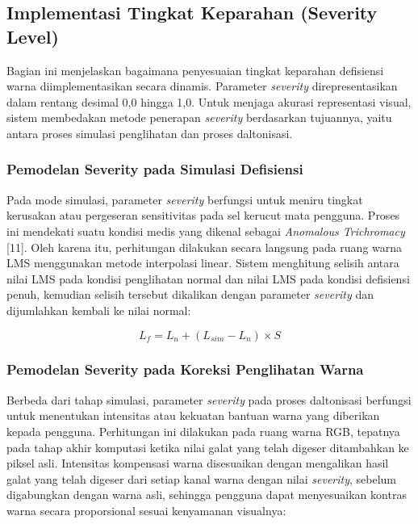 \subsection{Implementasi Tingkat Keparahan (Severity Level)}

Bagian ini menjelaskan bagaimana penyesuaian tingkat keparahan defisiensi warna diimplementasikan secara dinamis. Parameter \textit{severity} direpresentasikan dalam rentang desimal 0,0 hingga 1,0. Untuk menjaga akurasi representasi visual, sistem membedakan metode penerapan \textit{severity} berdasarkan tujuannya, yaitu antara proses simulasi penglihatan dan proses daltonisasi.

\subsubsection{Pemodelan Severity pada Simulasi Defisiensi}

Pada mode simulasi, parameter \textit{severity} berfungsi untuk meniru tingkat kerusakan atau pergeseran sensitivitas pada sel kerucut mata pengguna. Proses ini mendekati suatu kondisi medis yang dikenal sebagai \textit{Anomalous Trichromacy} [11]. Oleh karena itu, perhitungan dilakukan secara langsung pada ruang warna LMS menggunakan metode interpolasi linear. Sistem menghitung selisih antara nilai LMS pada kondisi penglihatan normal dan nilai LMS pada kondisi defisiensi penuh, kemudian selisih tersebut dikalikan dengan parameter \textit{severity} dan dijumlahkan kembali ke nilai normal:

\begin{equation}
L_{f} = L_{n} + (L_{sim} - L_{n}) \times S
\end{equation}

\subsubsection{Pemodelan Severity pada Koreksi Penglihatan Warna}

Berbeda dari tahap simulasi, parameter \textit{severity} pada proses daltonisasi berfungsi untuk menentukan intensitas atau kekuatan bantuan warna yang diberikan kepada pengguna. Perhitungan ini dilakukan pada ruang warna RGB, tepatnya pada tahap akhir komputasi ketika nilai galat yang telah digeser ditambahkan ke piksel asli. Intensitas kompensasi warna disesuaikan dengan mengalikan hasil galat yang telah digeser dari setiap kanal warna dengan nilai \textit{severity}, sebelum digabungkan dengan warna asli, sehingga pengguna dapat menyesuaikan kontras warna secara proporsional sesuai kenyamanan visualnya:

